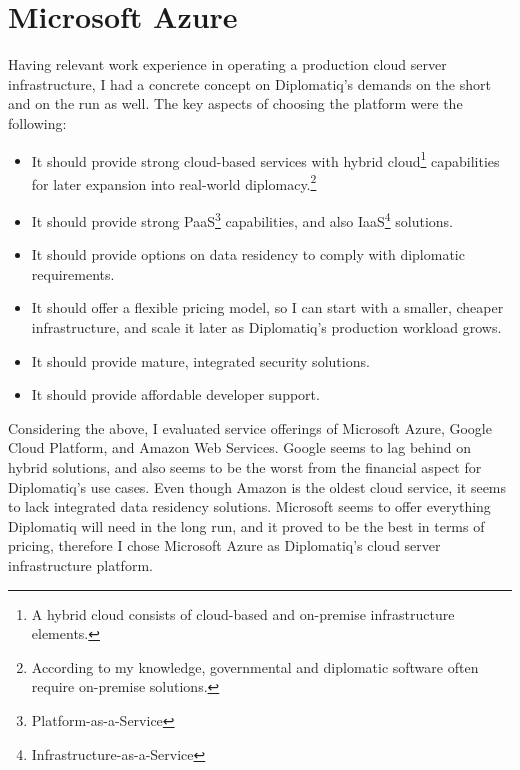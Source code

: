 \section{Microsoft Azure}

Having relevant work experience in operating a production cloud server infrastructure, I had a concrete concept on Diplomatiq's demands on the short and on the run as well. The key aspects of choosing the platform were the following:

\begin{itemize}
\item It should provide strong cloud-based services with hybrid cloud\footnote{A hybrid cloud consists of cloud-based and on-premise infrastructure elements.} capabilities for later expansion into real-world diplomacy.\footnote{According to my knowledge, governmental and diplomatic software often require on-premise solutions.}
\item It should provide strong PaaS\footnote{Platform-as-a-Service} capabilities, and also IaaS\footnote{Infrastructure-as-a-Service} solutions.
\item It should provide options on data residency to comply with diplomatic requirements.
\item It should offer a flexible pricing model, so I can start with a smaller, cheaper infrastructure, and scale it later as Diplomatiq's production workload grows.
\item It should provide mature, integrated security solutions.
\item It should provide affordable developer support.
\end{itemize}

Considering the above, I evaluated service offerings of Microsoft Azure, Google Cloud Platform, and Amazon Web Services. Google seems to lag behind on hybrid solutions, and also seems to be the worst from the financial aspect for Diplomatiq's use cases. Even though Amazon is the oldest cloud service, it seems to lack integrated data residency solutions. Microsoft seems to offer everything Diplomatiq will need in the long run, and it proved to be the best in terms of pricing, therefore I chose Microsoft Azure as Diplomatiq's cloud server infrastructure platform.

